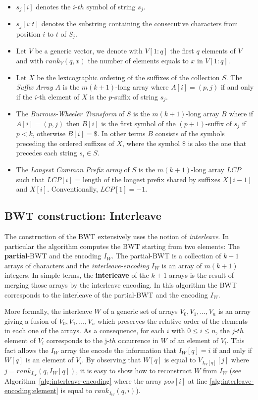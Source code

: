 \documentclass[a4paper,12pt, oneside]{article}
\begin{document}
\begin{itemize}
	\item $s_j[i]$ denotes the $i$-$th$ symbol of string $s_j$.
	\item $s_j[i:t]$ denotes the substring containing the consecutive characters from position $i$ to $t$ of $S_j$.
	\item Let $V$ be a generic vector, we denote with $V[1:q]$ the first $q$ elements of $V$ and with $rank_V(q, x)$ the number of elements equals to $x$ in $V[1:q]$.
	\item Let $X$ be the lexicographic ordering of the suffixes of the collection $S$. The \textit{Suffix Array} $A$ is the $m(k+1)$-long array where $A[i] = (p, j)$ if and only if the $i$-th element of $X$ is the $p$-suffix of string $s_j$.
	\item The \textit{Burrows-Wheeler Transform} of $S$ is the $m(k+1)$-long array $B$ where if $A[i] = (p, j)$ then $B[i]$ is the first symbol of the $(p+1)$-suffix of $s_j$ if $p < k$, otherwise $B[i] = \$$. In other terms $B$ consists of the symbols preceding the ordered suffixes of $X$, where the symbol $\$$ is also the one that precedes each string $s_i\in S$.
	\item The \textit{Longest Common Prefix array} of $S$ is the $m(k+1)$-long array $LCP$ such that $LCP[i]$ = 	length of the longest prefix shared by suffixes $X[i-1]$ and $X[i]$. Conventionally, $LCP[1] = -1$.

\end{itemize}	


\subsection{BWT construction: Interleave}

The construction of the BWT extensively uses the notion of \textit{interleave}. In particular the algorithm computes the BWT starting from two elements: The \textbf{partial}-BWT and the encoding $I_W$. The partial-BWT is a collection of $k+1$ arrays of characters and the \textit{interleave-encoding} $I_W$ is an array of $m(k+1)$ integers. In simple terms, the \textbf{interleave} of the $k+1$ arrays is the result of merging those arrays  by the interleave encoding. In this algorithm the BWT corresponds to the interleave of the partial-BWT and the encoding $I_W$.
\par
More formally, the interleave $W$ of a generic set of arrays $V_0,V_1,...,V_n$ is an array giving a fusion of $V_0, V_1, \ldots, V_n$ which preserves the relative order of the elements in each one of the arrays. As a consequence, for each $i$ with $0 \leq i \leq n$, the $j$-${th}$ element of $V_i$ corresponds to the j-${th}$ occurrence in $W$ of an element of $V_i$. This fact allows the $I_W$ array the encode the information that $I_W[q] = i$ if and only if $W[q]$ is an element of $V_i$. By observing that $W[q]$ is equal to $V_{I_W[q]}[j]$ where $j = rank_{I_W}(q, I_{W}[q])$, it is easy to show how to reconstruct $W$ from $I_W$ (see Algorithm~\ref{alg:interleave-encoding} where the array $pos[i]$ at line \ref{alg:interleave-encoding:element} is equal to $rank_{I_W}(q, i)$).
\end{document}
